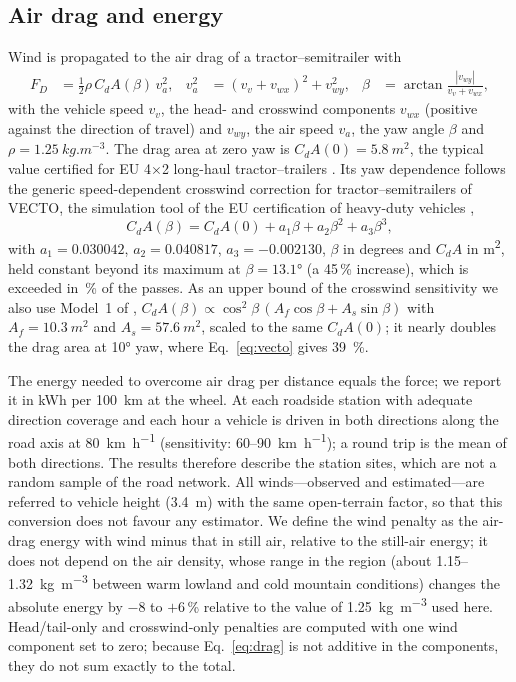 \subsection{Air drag and energy}
\label{sec:energy-method}
Wind is propagated to the air drag of a tractor--semitrailer with
\begin{align}
F_D &= \tfrac12 \rho\, C_dA(\beta)\, v_a^2, & v_a^2 &= (v_v+v_{wx})^2+v_{wy}^2, & \beta &= \arctan\frac{|v_{wy}|}{v_v+v_{wx}},
\label{eq:drag}
\end{align}
with the vehicle speed $v_v$, the head- and crosswind components $v_{wx}$ (positive against the direction of travel) and $v_{wy}$, the air speed $v_a$, the yaw angle $\beta$ and $\rho=\SI{1.25}{kg.m^{-3}}$. The drag area at zero yaw is $C_dA(0)=\SI{5.8}{m^2}$, the typical value certified for EU 4$\times$2 long-haul tractor--trailers \citep{ICCT_VECTO}. Its yaw dependence follows the generic speed-dependent crosswind correction for tractor--semitrailers of VECTO, the simulation tool of the EU certification of heavy-duty vehicles \citep{EU2017_2400,VECTO},
\begin{equation}
C_dA(\beta) = C_dA(0) + a_1\beta + a_2\beta^2 + a_3\beta^3,
\label{eq:vecto}
\end{equation}
with $a_1=0.030042$, $a_2=0.040817$, $a_3=-0.002130$, $\beta$ in degrees and $C_dA$ in \si{m^2}, held constant beyond its maximum at $\beta=\ang{13.1}$ (a 45\,\% increase), which is exceeded in \enCapPctNo\,\% of the passes. As an upper bound of the crosswind sensitivity we also use Model~1 of \citet{Askerdal2024crosswind}, $C_dA(\beta)\propto\cos^2\beta\,(A_f\cos\beta+A_s\sin\beta)$ with $A_f=\SI{10.3}{m^2}$ and $A_s=\SI{57.6}{m^2}$, scaled to the same $C_dA(0)$; it nearly doubles the drag area at \ang{10} yaw, where Eq.~\eqref{eq:vecto} gives \SI{39}{\percent}.

The energy needed to overcome air drag per distance equals the force; we report it in \si{kWh} per \SI{100}{km} at the wheel. At each roadside station with adequate direction coverage and each hour a vehicle is driven in both directions along the road axis at \SI{80}{km.h^{-1}} (sensitivity: 60--\SI{90}{km.h^{-1}}); a round trip is the mean of both directions. The results therefore describe the station sites, which are not a random sample of the road network. All winds---observed and estimated---are referred to vehicle height (\SI{3.4}{m}) with the same open-terrain factor, so that this conversion does not favour any estimator. We define the wind penalty as the air-drag energy with wind minus that in still air, relative to the still-air energy; it does not depend on the air density, whose range in the region (about 1.15--\SI{1.32}{kg.m^{-3}} between warm lowland and cold mountain conditions) changes the absolute energy by $-8$ to $+6$\,\% relative to the value of \SI{1.25}{kg.m^{-3}} used here. Head/tail-only and crosswind-only penalties are computed with one wind component set to zero; because Eq.~\eqref{eq:drag} is not additive in the components, they do not sum exactly to the total.

